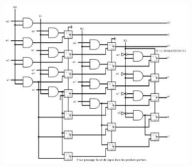 \documentclass[a4paper,10pt]{exam}
\begin{document}
\begin{enumerate}
\begin{solution}
      \includegraphics[width=10cm]{4-mult-CA-2}
    \end{solution}

\end{enumerate}
\end{document}
